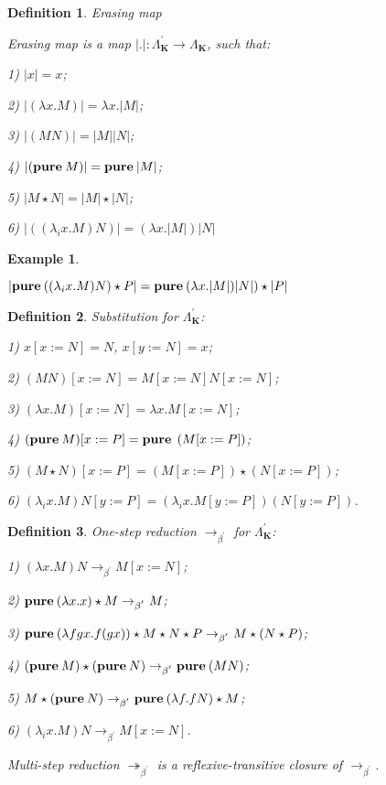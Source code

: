 \documentclass[a4paper]{article}
\newtheorem{defin}{Definition}
\newtheorem{ex}{Example}
\begin{document}
\begin{defin} Erasing map

Erasing map is a map $|.| : \Lambda^{'}_{\textbf{K}} \to \Lambda_{\textbf{K}}$, such that:

1) $|x| = x$;

2) $|(\lambda x. M)| = \lambda x. |M|$;

3) $|(M N)| = |M| |N|$;

4) $|({\bf pure \: } M)| = {\bf pure \: } |M|$;

5) $|M \star N| = |M| \star |N|$;

6) $|((\lambda_i x. M) N)| = (\lambda x. |M|) |N|$

\end{defin}

\begin{ex}

$ $

$|{\bf pure \: } ((\lambda_i x. M) N) \star P| = {\bf pure \: } (\lambda x. |M|) |N|) \star |P|$

\end{ex}

\begin{defin} Substitution for $\Lambda^{'}_{\textbf{K}}$:

1) $x [x := N] = N$, $x [y := N] = x$;

2) $(M N) [x := N] = M[x := N] N [x := N]$;

3) $(\lambda x. M) [x := N] = \lambda x. M [x := N]$;

4) $({\bf pure \: } M) [x := P] = {\bf pure \: } \: (M [x := P])$;

5) $(M \star N) [x := P] = (M [x := P]) \star (N [x := P])$;

6) $(\lambda_i x. M) N [y := P] = (\lambda_i x. M [y := P]) (N [y := P])$.

\end{defin}

\begin{defin} One-step reduction $\rightarrow_{\beta^{'}}$ for $\Lambda^{'}_{\textbf{K}}$:

1) $(\lambda x. M) N \rightarrow_{\beta^{'}} M [x := N]$;

2) ${\bf pure \: } (\lambda x. x) \star M \rightarrow_{\beta^{'}} M$;

3) ${\bf pure \: } (\lambda f g x. f (g x)) \star M \star N \star P \rightarrow_{\beta^{'}} M \star (N \star
P)$;

4) $({\bf pure \: } M) \star ({\bf pure \: } N) \rightarrow_{\beta^{'}} {\bf pure \: } (M N)$;

5) $M \star ({\bf pure \: } N) \rightarrow_{\beta^{'}} {\bf pure \: } (\lambda f. f N) \star M$;

6) $(\lambda_i x. M) N \rightarrow_{\beta^{'}} M [x := N]$.


Multi-step reduction $\twoheadrightarrow_{\beta^{'}}$ is a reflexive-transitive closure of
$\rightarrow_{\beta^{'}}$.

\end{defin}
\end{document}
